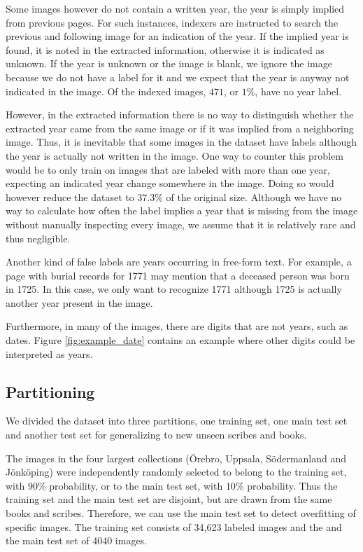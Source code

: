 Some images however do not contain a written year, the year is simply implied from previous pages. For such instances, indexers are instructed to search the previous and following image for an indication of the year. If the implied year is found, it is noted in the extracted information, otherwise it is indicated as unknown.
If the year is unknown or the image is blank, we ignore the image because we do not have a label for it and we expect that the year is anyway not indicated in the image. Of the indexed images, $471$, or $1\%$, have no year label.

However, in the extracted information there is no way to distinguish whether the extracted year came from the same image or if it was implied from a neighboring image. Thus, it is inevitable that some images in the dataset have labels although the year is actually not written in the image. One way to counter this problem would be to only train on images that are labeled with more than one year, expecting an indicated year change somewhere in the image. Doing so would however reduce the dataset to $37.3\%$ of the original size.
Although we have no way to calculate how often the label implies a year that is missing from the image without manually inspecting every image, we assume that it is relatively rare and thus negligible.

Another kind of false labels are years occurring in free-form text. For example, a page with burial records for 1771 may mention that a deceased person was born in 1725. In this case, we only want to recognize 1771 although 1725 is actually another year present in the image.



Furthermore, in many of the images, there are digits that are not years, such as dates. Figure \ref{fig:example_date} contains an example where other digits could be interpreted as years.

\subsection{Partitioning}

We divided the dataset into three partitions, one training set, one main test set and another test set for generalizing to new unseen scribes and books.

The images in the four largest collections (Örebro, Uppsala, Södermanland and Jönköping) were independently randomly selected to belong to the training set, with $90\%$ probability, or to the main test set, with $10\%$ probability.
Thus the training set and the main test set are disjoint, but are drawn from the same books and scribes. Therefore, we can use the main test set to detect overfitting of specific images.
The training set consists of 34,623 labeled images and the and the main test set of 4040 images.


